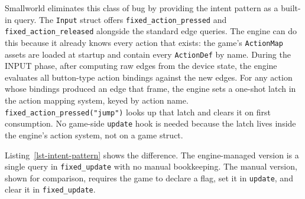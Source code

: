 \documentclass[
  11pt,
  letterpaper,
  DIV=11,
  numbers=noendperiod,
  twoside,
  open=right]{scrreprt}
\begin{document}
Smallworld eliminates this class of bug by providing the intent pattern
as a built-in query. The \texttt{Input} struct offers
\texttt{fixed\_action\_pressed} and \texttt{fixed\_action\_released}
alongside the standard edge queries. The engine can do this because it
already knows every action that exists: the game's \texttt{ActionMap}
assets are loaded at startup and contain every \texttt{ActionDef} by
name. During the INPUT phase, after computing raw edges from the device
state, the engine evaluates all button-type action bindings against the
new edges. For any action whose bindings produced an edge that frame,
the engine sets a one-shot latch in the action mapping system, keyed by
action name. \texttt{fixed\_action\_pressed("jump")} looks up that latch
and clears it on first consumption. No game-side \texttt{update} hook is
needed because the latch lives inside the engine's action system, not on
a game struct.

Listing~\ref{lst-intent-pattern} shows the difference. The
engine-managed version is a single query in \texttt{fixed\_update} with
no manual bookkeeping. The manual version, shown for comparison,
requires the game to declare a flag, set it in \texttt{update}, and
clear it in \texttt{fixed\_update}.
\end{document}
